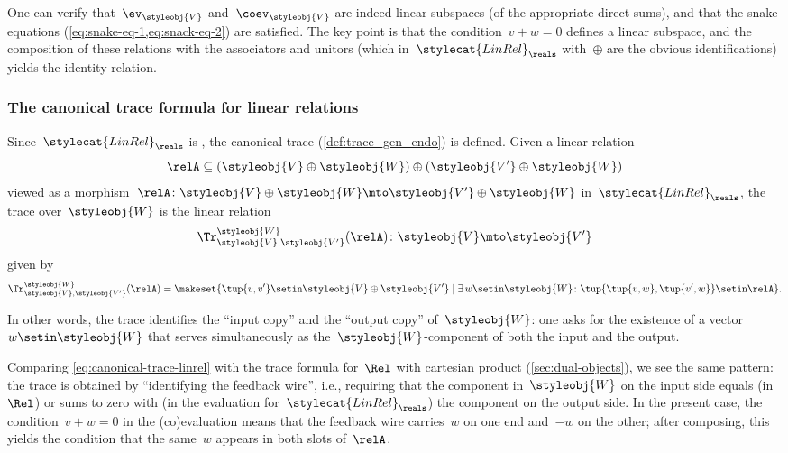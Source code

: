 \begin{remark}
    One can verify that~$\ev_\styleobj{V}$ and~$\coev_\styleobj{V}$ are indeed linear subspaces (of the appropriate direct sums), and that the snake equations (\cref{eq:snake-eq-1,eq:snack-eq-2}) are satisfied.
    The key point is that the condition~$v + w = 0$ defines a linear subspace, and the composition of these relations with the associators and unitors (which in~$\stylecat{LinRel}_\reals$ with~$\oplus$ are the obvious identifications) yields the identity relation.
\end{remark}

\subsubsection{The canonical trace formula for linear relations}

Since~$\stylecat{LinRel}_\reals$ is , the canonical trace (\cref{def:trace_gen_endo}) is defined.
Given a linear relation
\begin{equation}
    \relA \subseteq (\styleobj{V} \oplus \styleobj{W}) \oplus (\styleobj{V'} \oplus \styleobj{W})
\end{equation}
viewed as a morphism~$\relA \colon \styleobj{V} \oplus \styleobj{W} \mto \styleobj{V'} \oplus \styleobj{W}$ in~$\stylecat{LinRel}_\reals$, the trace over~$\styleobj{W}$ is the linear relation
\begin{equation}
    \Tr_{\styleobj{V}, \styleobj{V'}}^{\styleobj{W}}(\relA) \colon \styleobj{V} \mto \styleobj{V'}
\end{equation}
given by
\begin{equation}
    \label{eq:canonical-trace-linrel}
    \Tr_{\styleobj{V}, \styleobj{V'}}^{\styleobj{W}}(\relA) = \makeset{ \tup{v, v'} \setin \styleobj{V} \oplus \styleobj{V'} \mid \exists\, w \setin \styleobj{W} \colon \tup{\tup{v, w}, \tup{v', w}} \setin \relA }.
\end{equation}

In other words, the trace identifies the ``input copy'' and the ``output copy'' of~$\styleobj{W}$: one asks for the existence of a vector~$w \setin \styleobj{W}$ that serves simultaneously as the~$\styleobj{W}$-component of both the input and the output.

\begin{remark}
    Comparing \cref{eq:canonical-trace-linrel} with the trace formula for~$\Rel$ with cartesian product (\cref{sec:dual-objects}), we see the same pattern: the trace is obtained by ``identifying the feedback wire'', i.e., requiring that the component in~$\styleobj{W}$ on the input side equals (in~$\Rel$) or sums to zero with (in the evaluation for~$\stylecat{LinRel}_\reals$) the component on the output side.
    In the present case, the condition~$v + w = 0$ in the (co)evaluation means that the feedback wire carries~$w$ on one end and~$-w$ on the other; after composing, this yields the condition that the same~$w$ appears in both slots of~$\relA$.
\end{remark}

